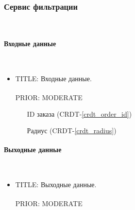 \subsubsection{Сервис фильтрации} \mbox{} \\ \label{driver_filters_taxi_service}

      \paragraph{Входные данные} \mbox{} \\ \label{driver_filters_taxi_service_input_data}

        \begin{itemize}

          \item{

            TITLE: Входные данные.\\
            \\
            PRIOR: MODERATE\\

          }

          \begin{itemize}
            \item [ID заказа] (CRDT-\ref{crdt_order_id})
            \item [Радиус] (CRDT-\ref{crdt_radius})
          \end{itemize}

        \end{itemize}

      \paragraph{Выходные данные} \mbox{} \\

        \begin{itemize}

          \item{

            TITLE: Выходные данные.\\
            \\
            PRIOR: MODERATE\\

          }

        \end{itemize}

